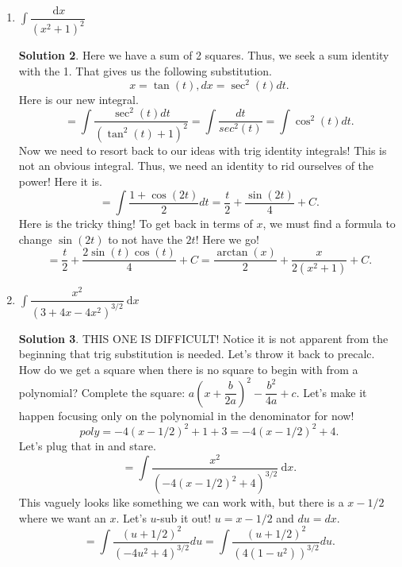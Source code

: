 \documentclass[10pt]{article}
\newcommand{\ds}{\displaystyle}
\newcommand{\dx}{\:\mathrm{d}x}
\theoremstyle{Theorem}
\theoremstyle{definition}
\newtheorem*{solution}{Solution}
\theoremstyle{remark}
\theoremstyle{custom}
\begin{document}
\begin{enumerate}[1.]
\begin{solution}
$$=\int \dfrac{x}{\sqrt{36(1-(x/6)^2}}\dx.$$
the difference in the root ressembles our favorite trig identity! 
$$\dfrac{x}{6}=\sin(t) \Rightarrow x=6\sin(t), dx=6\cos(t)dt.$$
Thus our integral is as follows.
$$=\int \dfrac{36\sin(t)\cos(t) dt}{6\sqrt{1-\sin^2(t)}}=\int \dfrac{36\sin(t)\cos(t) dt}{6\cos(t)}=6\int \sin(t) dt=-6\cos(t)+C.$$
Now is where many students get stuck. Let's get this back to being in terms of $x$. Notice it will be difficult with $t$ embedded inside of a $\cos$. This is where our right triangle trig and Pythagorean Theorem come in. Based off of our substitution, $opp=x$ and $hyp=6$. This means that $adj=\sqrt{36-x^2}$. Now we can replace $\cos(t)$ with our Soh Cah Toa.
$$=-6\left(\dfrac{\sqrt{36-x^2}}{6}\right)+C=-\sqrt{36-x^2}+C.$$
\end{solution}
\item $\ds \int \dfrac{\dx}{(x^2+1)^2}$
\begin{solution}
Here we have a sum of 2 squares. Thus, we seek a sum identity with the 1. That gives us the following substitution.
$$x=\tan(t), dx=\sec^2(t)dt.$$
Here is our new integral.
$$=\int \dfrac{\sec^2(t)dt}{(\tan^2(t)+1)^2}=\int \dfrac{dt}{sec^2(t)}=\int \cos^2(t)dt.$$
Now we need to resort back to our ideas with trig identity integrals! This is not an obvious integral. Thus, we need an identity to rid ourselves of the power! Here it is.
$$=\int \dfrac{1+\cos(2t)}{2}dt=\dfrac{t}{2}+\dfrac{\sin(2t)}{4}+C.$$
Here is the tricky thing! To get back in terms of $x$, we must find a formula to change $\sin(2t)$ to not have the $2t$!  Here we go!
$$=\dfrac{t}{2}+\dfrac{2\sin(t)\cos(t)}{4}+C=\dfrac{\arctan(x)}{2}+\dfrac{x}{2(x^2+1)}+C.$$
\end{solution}
\item $\ds \int \dfrac{x^2}{(3+4x-4x^2)^{3/2}}\dx$
\begin{solution}
THIS ONE IS DIFFICULT! Notice it is not apparent from the beginning that trig substitution is needed. Let's throw it back to precalc. How do we get a square when there is no square to begin with from a polynomial? Complete the square: $a\left(x+\dfrac{b}{2a}\right)^2-\dfrac{b^2}{4a}+c$. Let's make it happen focusing only on the polynomial in the denominator for now!
$$poly=-4(x-1/2)^2+1+3=-4(x-1/2)^2+4.$$
Let's plug that in and stare.
$$=\int \dfrac{x^2}{(-4(x-1/2)^2+4)^{3/2}}\dx.$$
This vaguely looks like something we can work with, but there is a $x-1/2$ where we want an $x$. Let's $u$-sub it out! $u=x-1/2$ and $du=dx$.
$$=\int \dfrac{(u+1/2)^2}{(-4u^2+4)^{3/2}}du=\int \dfrac{(u+1/2)^2}{(4(1-u^2))^{3/2}}du.$$

\end{solution}
\end{enumerate}
\end{document}
